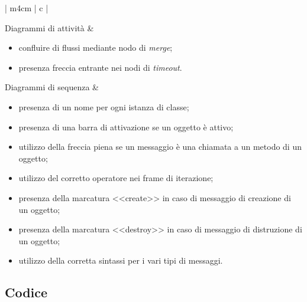 \begin{longtable}{| m{4cm} | c |}
\begin{minipage}[c]{0.7\textwidth}
\begin{itemize}
			\end{itemize}
			\vspace{0.2cm}
		\end{minipage}
	\hline
		Diagrammi di attività
		&
		\begin{minipage}[c]{0.7\textwidth}
			\vspace{0.2cm}
			\begin{itemize}
				\item confluire di flussi mediante nodo di \textit{merge};
				\item presenza freccia entrante nei nodi di \textit{timeout}.
			\end{itemize}
			\vspace{0.2cm}
		\end{minipage}
	\hline
		Diagrammi di sequenza
		&
		\begin{minipage}[c]{0.7\textwidth}
			\vspace{0.2cm}
			\begin{itemize}
				\item presenza di un nome per ogni istanza di classe;
				\item presenza di una barra di attivazione se un oggetto è attivo;
				\item utilizzo della freccia piena se un messaggio è una chiamata a un metodo di un oggetto;
				\item utilizzo del corretto operatore nei frame di iterazione;
				\item presenza della marcatura \textless \textless create\textgreater \textgreater {} in caso di messaggio di creazione di un oggetto;
				\item presenza della marcatura \textless \textless destroy\textgreater \textgreater {} in caso di messaggio di distruzione di un oggetto;
				\item utilizzo della corretta sintassi per i vari tipi di messaggi.
			\end{itemize}
			\vspace{0.2cm}
		\end{minipage}
	\hline
	\caption[Lista di controllo per i diagrammi UML]{Lista di controllo per i diagrammi UML}
	\end{longtable}

\subsection{Codice} \label{listeCodice}

